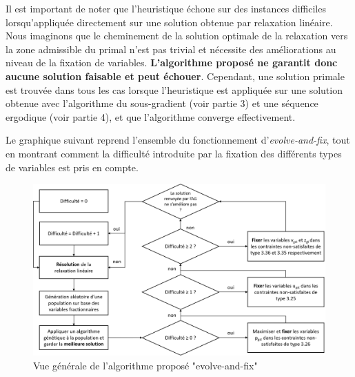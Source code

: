 Il est important de noter que l'heuristique échoue sur des instances difficiles lorsqu'appliquée
directement sur une solution obtenue par relaxation linéaire. Nous imaginons que le cheminement
de la solution optimale de la relaxation vers la zone admissible du primal n'est pas trivial
et nécessite des améliorations au niveau de la fixation de variables.
\textbf{L'algorithme proposé ne garantit donc aucune solution faisable et peut échouer}.
Cependant, une solution primale est trouvée dans tous les cas lorsque l'heuristique
est appliquée sur une solution obtenue avec l'algorithme du sous-gradient (voir partie 3) et une
séquence ergodique (voir partie 4), et que l'algorithme converge effectivement.

Le graphique suivant reprend l'ensemble du fonctionnement d'\textit{evolve-and-fix}, tout en montrant comment
la difficulté introduite par la fixation des différents types de variables est pris en compte.

\begin{figure}[h!]
    \begin{center}
        \includegraphics[width=\textwidth]{imgs/evolveandfix.png}\\
        Vue générale de l'algorithme proposé "evolve-and-fix"
    \end{center}
\end{figure}